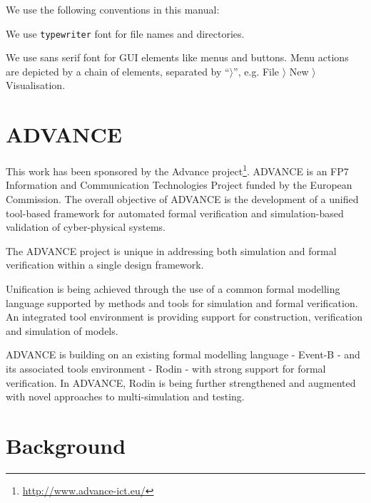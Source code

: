 \documentclass[twoside,10pt]{book}
\begin{document}
We use the following conventions in this manual:


We use \texttt{typewriter} font for file names and directories.

We use \textsf{sans serif font} for GUI elements like menus and buttons.  Menu actions are depicted by a chain of elements, separated by ``$\rangle$'', e.g. \textsf{File $\rangle$ New $\rangle$ Visualisation}.

\section{ADVANCE}
\label{advance}

This work has been sponsored by the Advance project\footnote{\url{http://www.advance-ict.eu/}}.  ADVANCE is an FP7 Information and Communication Technologies Project funded by the European Commission. The overall objective of ADVANCE is the development of a unified tool-based framework for automated formal verification and simulation-based validation of cyber-physical systems.

The ADVANCE project is unique in addressing both simulation and formal verification within a single design framework.

Unification is being achieved through the use of a common formal modelling language supported by methods and tools for simulation and formal verification. An integrated tool environment is providing support for construction, verification and simulation of models.

ADVANCE is building on an existing formal modelling language - Event-B - and its associated tools environment - Rodin - with strong support for formal verification. In ADVANCE, Rodin is being further strengthened and augmented with novel approaches to multi-simulation and testing.



% 

\section{Background}
\end{document}
